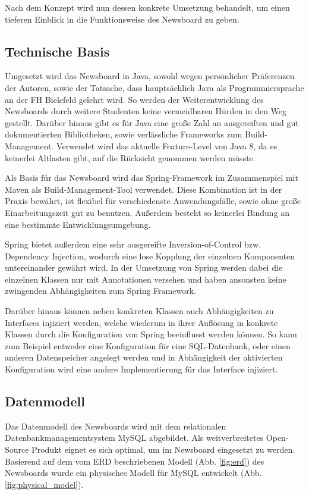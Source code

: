 Nach dem Konzept wird nun dessen konkrete Umsetzung behandelt,
um einen tieferen Einblick in die Funktionsweise des Newsboard zu geben.

\subsection{Technische Basis}
Umgesetzt wird das Newsboard in Java, sowohl wegen persönlicher Präferenzen der Autoren,
sowie der Tatsache, dass hauptsächlich Java als Programmiersprache
an der FH Bielefeld gelehrt wird. So werden der Weiterentwicklung des Newsboards
durch weitere Studenten keine vermeidbaren Hürden in den Weg gestellt.
Darüber hinaus gibt es für Java eine große Zahl an ausgereiften
und gut dokumentierten Bibliotheken, sowie verlässliche Frameworks zum 
Build-Management. Verwendet wird das aktuelle Feature-Level von Java 8,
da es keinerlei Altlasten gibt, auf die Rücksicht genommen werden müsste.

Als Basis für das Newsboard wird das Spring-Framework im Zusammenspiel mit Maven
als Build-Management-Tool verwendet. Diese Kombination ist in der Praxis bewährt,
ist flexibel für verschiedenste Anwendungsfälle, sowie ohne große Einarbeitungszeit
gut zu benutzen. Außerdem besteht so keinerlei Bindung
an eine bestimmte Entwicklungsumgebung.

Spring bietet außerdem eine sehr ausgereifte Inversion-of-Control bzw.
Dependency Injection, wodurch eine lose Kopplung der einzelnen Komponenten
untereinander gewährt wird\cite{fowler-ioc}.
In der Umsetzung von Spring werden dabei die einzelnen Klassen nur mit
Annotationen versehen und haben ansonsten keine zwingenden Abhängigkeiten
zum Spring Framework.

Darüber hinaus können neben konkreten Klassen auch Abhängigkeiten zu Interfaces
injiziert werden, welche wiederum in ihrer Auflösung in konkrete Klassen
durch die Konfiguration von Spring beeinflusst werden können.
So kann zum Beispiel entweder eine Konfiguration für eine SQL-Datenbank,
oder einen anderen Datenspeicher angelegt werden und in Abhängigkeit
der aktivierten Konfiguration wird eine andere Implementierung für das
Interface injiziert.

\subsection{Datenmodell}
Das Datenmodell des Newsboards wird mit dem relationalen Datenbankmanagementsystem MySQL
abgebildet. Als weitverbreitetes Open-Source Produkt eignet es sich optimal, um im
Newsboard eingesetzt zu werden. Basierend auf dem vom ERD beschriebenen Modell
(Abb. \ref{fig:erd}) des Newsboards wurde ein physisches Modell für MySQL entwickelt
(Abb. \ref{fig:physical_model}).

